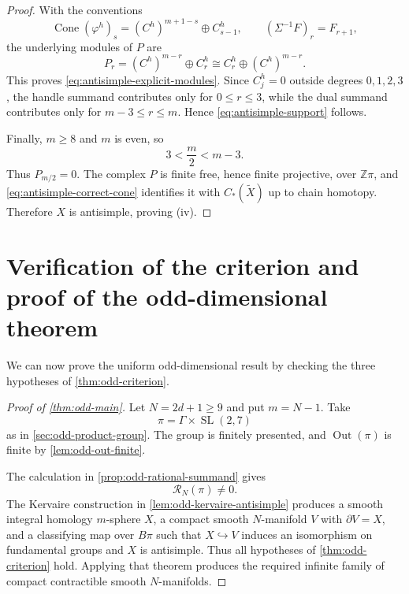\documentclass[10pt,reqno]{amsart}
\numberwithin{equation}{section}
\theoremstyle{definition}
\theoremstyle{remark}
\newcommand{\Z}{\mathbb Z}
\newcommand{\Out}{\operatorname{Out}}
\newcommand{\SL}{\operatorname{SL}}
\newcommand{\cR}{\mathcal R}
\begin{document}
\begin{proof}
With the conventions
\[
\operatorname{Cone}(\varphi^h)_s
=
(C^h)^{m+1-s}\oplus C^h_{s-1},
\qquad
(\Sigma^{-1}F)_r=F_{r+1},
\]
the underlying modules of \(P\) are
\[
P_r
=
(C^h)^{m-r}\oplus C^h_r
\cong
C^h_r\oplus(C^h)^{m-r}.
\]
This proves \eqref{eq:antisimple-explicit-modules}.  Since
\(C^h_j=0\) outside degrees \(0,1,2,3\), the handle summand contributes
only for \(0\leq r\leq3\), while the dual summand contributes only
for \(m-3\leq r\leq m\).  Hence
\eqref{eq:antisimple-support} follows.

Finally, \(m\geq8\) and \(m\) is even, so
\[
3<\frac m2<m-3.
\]
Thus \(P_{m/2}=0\).  The complex \(P\) is finite free, hence finite
projective, over \(\Z\pi\), and
\eqref{eq:antisimple-correct-cone} identifies it with
\(C_*(\widetilde X)\) up to chain homotopy.  Therefore \(X\) is
antisimple, proving (iv).
\end{proof}

\section{Verification of the criterion and proof of the odd-dimensional theorem}
\label{sec:odd-criterion-application}

We can now prove the uniform odd-dimensional result by checking the
three hypotheses of \cref{thm:odd-criterion}.

\begin{proof}[Proof of \cref{thm:odd-main}]
Let \(N=2d+1\geq9\) and put \(m=N-1\).  Take
\[
\pi=\Gamma\times\SL(2,7)
\]
as in \cref{sec:odd-product-group}.  The group is finitely presented,
and \(\Out(\pi)\) is finite by \cref{lem:odd-out-finite}.

The calculation in \cref{prop:odd-rational-summand} gives
\[
\cR_N(\pi)\neq0.
\]
The Kervaire construction in \cref{lem:odd-kervaire-antisimple}
produces a smooth integral homology \(m\)-sphere \(X\), a compact
smooth \(N\)-manifold \(V\) with \(\partial V=X\), and a classifying
map over \(B\pi\) such that \(X\hookrightarrow V\) induces an
isomorphism on fundamental groups and \(X\) is antisimple.  Thus all
hypotheses of \cref{thm:odd-criterion} hold.  Applying that theorem
produces the required infinite family of compact contractible smooth
\(N\)-manifolds.
\end{proof}
\end{document}
